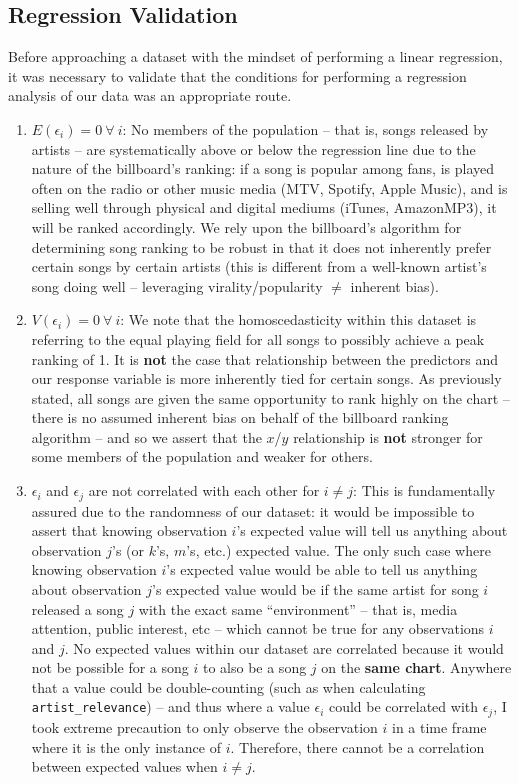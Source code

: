 \documentclass[11pt]{article} %
\begin{document}
\subsection*{Regression Validation}
Before approaching a dataset with the mindset of performing a linear regression, it was necessary to validate that the conditions for performing a regression analysis of our data was an appropriate route.

\begin{enumerate}
	\item \textbf{$E(\epsilon_i) = 0\ \forall\ i$}: No members of the population -- that is, songs released by artists -- are systematically above or below the regression line due to the nature of the billboard's ranking: if a song is popular among fans, is played often on the radio or other music media (MTV, Spotify, Apple Music), and is selling well through physical and digital mediums (iTunes, AmazonMP3), it will be ranked accordingly. We rely upon the billboard's algorithm for determining song ranking to be robust in that it does not inherently prefer certain songs by certain artists (this is different from a well-known artist's song doing well -- leveraging virality/popularity $\neq$ inherent bias).
	
	\item \textbf{$V(\epsilon_i) = 0\ \forall\ i$}: We note that the homoscedasticity within this dataset is referring to the equal playing field for all songs to possibly achieve a peak ranking of 1. It is \textbf{not} the case that relationship between the predictors and our response variable is more inherently tied for certain songs. As previously stated, all songs are given the same opportunity to rank highly on the chart -- there is no assumed inherent bias on behalf of the billboard ranking algorithm -- and so we assert that the $x$/$y$ relationship is \textbf{not} stronger for some members of the population and weaker for others.
	
	\item $\epsilon_i$ and $\epsilon_j$ are not correlated with each other for $i \neq j$: This is fundamentally assured due to the randomness of our dataset: it would be impossible to assert that knowing observation $i$'s expected value will tell us anything about observation $j$'s (or $k$'s, $m$'s, etc.) expected value. The only such case where knowing observation $i$'s expected value would be able to tell us anything about observation $j$'s expected value would be if the same artist for song $i$ released a song $j$ with the exact same ``environment'' -- that is, media attention, public interest, etc -- which cannot be true for any observations $i$ and $j$. No expected values within our dataset are correlated because it would not be possible for a song $i$ to also be a song $j$ on the \textbf{same chart}. Anywhere that a value could be double-counting (such as when calculating \texttt{artist\_relevance}) -- and thus where a value $\epsilon_i$ could be correlated with $\epsilon_j$, I took extreme precaution to only observe the observation $i$ in a time frame where it is the only instance of $i$. Therefore, there cannot be a correlation between expected values when $i \neq j$.
	

\end{enumerate}
\end{document}

